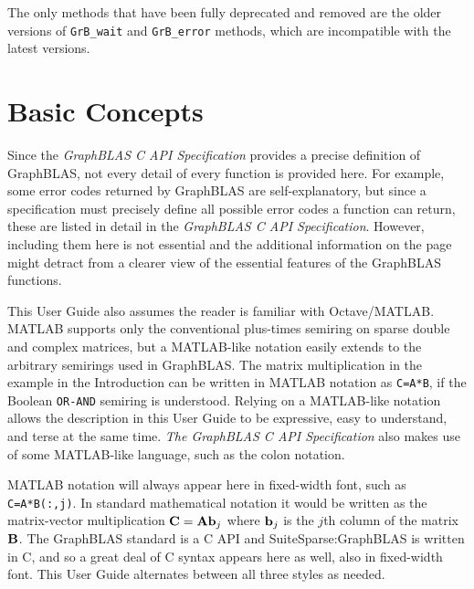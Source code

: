 \documentclass[12pt]{article}
\begin{document}
The only methods that have been fully deprecated and removed are the older
versions of \verb'GrB_wait' and \verb'GrB_error' methods, which are
incompatible with the latest versions.

\newpage
\section{Basic Concepts} %
\label{basic}

Since the {\em GraphBLAS C API Specification} provides a precise definition of
GraphBLAS, not every detail of every function is provided here.  For example,
some error codes returned by GraphBLAS are self-explanatory, but since a
specification must precisely define all possible error codes a function can
return, these are listed in detail in the {\em GraphBLAS C API Specification}.
However, including them here is not essential and the additional information on
the page might detract from a clearer view of the essential features of the
GraphBLAS functions.

This User Guide also assumes the reader is familiar with Octave/MATLAB.
MATLAB supports only the conventional plus-times semiring on sparse
double and complex matrices, but a MATLAB-like notation easily extends to the
arbitrary semirings used in GraphBLAS.  The matrix multiplication in the
example in the Introduction can be written in MATLAB notation as
\verb'C=A*B', if the Boolean \verb'OR-AND' semiring is understood.  Relying on
a MATLAB-like notation allows the description in this User Guide to be
expressive, easy to understand, and terse at the same time.  {\em The GraphBLAS
C API Specification} also makes use of some MATLAB-like language, such
as the colon notation.

MATLAB notation will always appear here in fixed-width font, such as
\verb'C=A*B(:,j)'.  In standard mathematical notation it would be written as
the matrix-vector multiplication ${\bf C = A b}_j$ where ${\bf b}_j$ is the
$j$th column of the matrix ${\bf B}$.  The GraphBLAS standard is a C API and
SuiteSparse:GraphBLAS is written in C, and so a great deal of C syntax appears
here as well, also in fixed-width font.  This User Guide alternates between all
three styles as needed.

\end{document}
